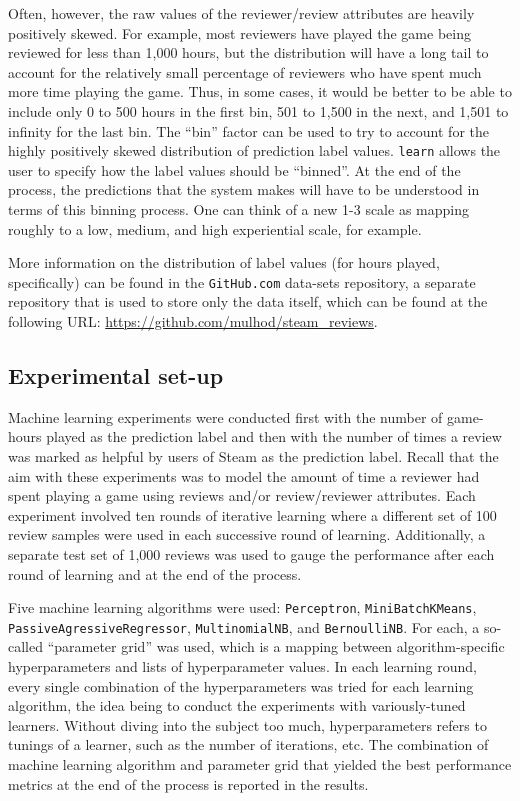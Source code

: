 \documentclass[9pt]{article}
\begin{document}
Often, however, the raw values of the reviewer/review attributes are heavily positively skewed. For example, most reviewers have played the game being reviewed for less than 1,000 hours, but the distribution will have a long tail to account for the relatively small percentage of reviewers who have spent much more time playing the game. Thus, in some cases, it would be better to be able to include only 0 to 500 hours in the first bin, 501 to 1,500 in the next, and 1,501 to infinity for the last bin. The ``bin'' factor can be used to try to account for the highly positively skewed distribution of prediction label values. {\tt learn} allows the user to specify how the label values should be ``binned''. At the end of the process, the predictions that the system makes will have to be understood in terms of this binning process. One can think of a new 1-3 scale as mapping roughly to a low, medium, and high experiential scale, for example.

More information on the distribution of label values (for hours played, specifically) can be found in the {\tt GitHub.com} data-sets repository, a separate repository that is used to store only the data itself, which can be found at the following URL: \url{https://github.com/mulhod/steam_reviews}.

\subsection{Experimental set-up}
\label{ssec:experimental_setup}

Machine learning experiments were conducted first with the number of game-hours played as the prediction label and then with the number of times a review was marked as helpful by users of Steam as the prediction label. Recall that the aim with these experiments was to model the amount of time a reviewer had spent playing a game using reviews and/or review/reviewer attributes. Each experiment involved ten rounds of iterative learning where a different set of 100 review samples were used in each successive round of learning. Additionally, a separate test set of 1,000 reviews was used to gauge the performance after each round of learning and at the end of the process.

Five machine learning algorithms were used: {\tt Perceptron}, {\tt MiniBatchKMeans}, {\tt PassiveAgressiveRegressor}, {\tt MultinomialNB}, and {\tt BernoulliNB}. For each, a so-called ``parameter grid'' was used, which is a mapping between algorithm-specific hyperparameters and lists of hyperparameter values. In each learning round, every single combination of the hyperparameters was tried for each learning algorithm, the idea being to conduct the experiments with variously-tuned learners. Without diving into the subject too much, hyperparameters refers to tunings of a learner, such as the number of iterations, etc. The combination of machine learning algorithm and parameter grid that yielded the best performance metrics at the end of the process is reported in the results.
\end{document}

